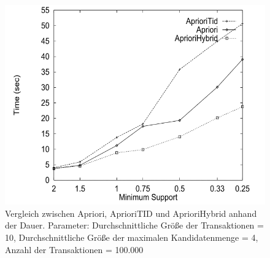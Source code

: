 \begin{figure}[h]
\centering
\includegraphics[width=0.7\linewidth]{./images/hybrid}
\caption[Apriori vs AprioriTID vs AprioriHybrid]{Vergleich zwischen Apriori, AprioriTID und AprioriHybrid anhand der Dauer. Parameter: Durchschnittliche Größe der Transaktionen = 10, Durchschnittliche Größe der maximalen Kandidatenmenge = 4, Anzahl der Transaktionen = 100.000 \parencite[Quelle:][3.6 Algorithm AprioriHybrid - Figure 7]{IBM}}
\label{fig:hybrid}
\end{figure}




